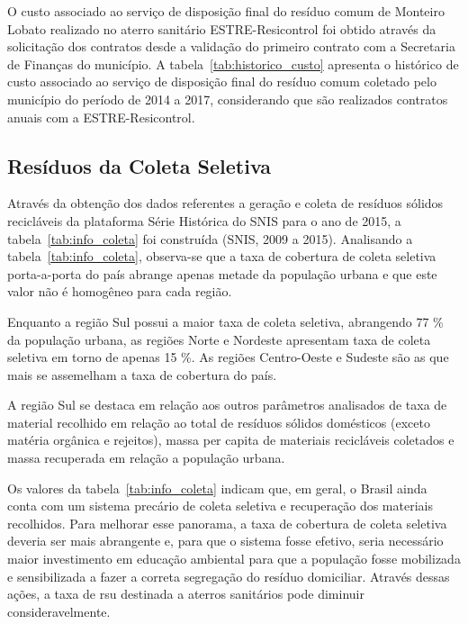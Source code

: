 	

	O custo associado ao serviço de disposição final do resíduo comum de Monteiro Lobato realizado no aterro sanitário ESTRE-Resicontrol foi obtido através da solicitação dos contratos desde a validação do primeiro contrato com a Secretaria de Finanças do município. A tabela~\ref{tab:historico_custo} apresenta o histórico de custo associado ao serviço de disposição final do resíduo comum coletado pelo município do período de 2014 a 2017, considerando que são realizados contratos anuais com a ESTRE-Resicontrol.
	
	
	
	\subsection{Resíduos da Coleta Seletiva}
	
	Através da obtenção dos dados referentes a geração e coleta de resíduos sólidos recicláveis da plataforma Série Histórica do SNIS para o ano de 2015, a tabela~\ref{tab:info_coleta} foi construída (SNIS, 2009 a 2015). Analisando a tabela~\ref{tab:info_coleta}, observa-se que a taxa de cobertura de coleta seletiva porta-a-porta do país abrange apenas metade da população urbana e que este valor não é homogêneo para cada região.
	
	Enquanto a região Sul possui a maior taxa de coleta seletiva, abrangendo 77 \% da população urbana, as regiões Norte e Nordeste apresentam taxa de coleta seletiva em torno de apenas 15 \%. As regiões Centro-Oeste e Sudeste são as que mais se assemelham a taxa de cobertura do país.
	
	A região Sul se destaca em relação aos outros parâmetros analisados de taxa de material recolhido em relação ao total de resíduos sólidos domésticos (exceto matéria orgânica e rejeitos), massa per capita de materiais recicláveis coletados e massa recuperada em relação a população urbana.
	
	
	
	Os valores da tabela~\ref{tab:info_coleta} indicam que, em geral, o Brasil ainda conta com um sistema precário de coleta seletiva e recuperação dos materiais recolhidos. Para melhorar esse panorama, a taxa de cobertura de coleta seletiva deveria ser mais abrangente e, para que o sistema fosse efetivo, seria necessário maior investimento em educação ambiental para que a população fosse mobilizada e sensibilizada a fazer a correta segregação do resíduo domiciliar. Através dessas ações, a taxa de \gls{rsu} destinada a aterros sanitários pode diminuir consideravelmente.
	
